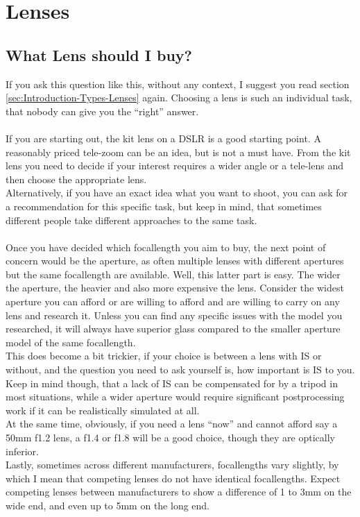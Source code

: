 \chapter{Lenses}
\label{chap:Lenses}





\section{What Lens should I buy?}

If you ask this question like this, without any context, I suggest you read section \ref{sec:Introduction-Types-Lenses} again. Choosing a lens is such an individual task, that nobody can give you the ``right'' answer.
\\
\\
If you are starting out, the kit lens on a \gls{DSLR} is a good starting point. A reasonably priced tele-zoom can be an idea, but is not a must have. From the kit lens you need to decide if your interest requires a wider angle or a tele-lens and then choose the appropriate lens.
\\
Alternatively, if you have an exact idea what you want to shoot, you can ask for a recommendation for this specific task, but keep in mind, that sometimes different people take different approaches to the same task.
\\
\\
Once you have decided which \gls{focallength} you aim to buy, the next point of concern would be the \gls{aperture}, as often multiple lenses with different \glspl{aperture} but the same \gls{focallength} are available. Well, this latter part is easy. The wider the \gls{aperture}, the heavier and also more expensive the lens. Consider the widest \gls{aperture} you can afford or are willing to afford and are willing to carry on any lens and research it. Unless you can find any specific issues with the model you researched, it will always have superior glass compared to the smaller \gls{aperture} model of the same \gls{focallength}.
\\
This does become a bit trickier, if your choice is between a lens with \gls{IS} or without, and the question you need to ask yourself is, how important is \gls{IS} to you. Keep in mind though, that a lack of \gls{IS} can be compensated for by a tripod in most situations, while a wider \gls{aperture} would require significant postprocessing work if it can be realistically simulated at all.
\\
At the same time, obviously, if you need a lens ``now'' and cannot afford say a 50mm f1.2 lens, a f1.4 or f1.8 will be a good choice, though they are optically inferior.
\\
Lastly, sometimes across different manufacturers, \glspl{focallength} vary slightly, by which I mean that competing lenses do not have identical \glspl{focallength}. Expect competing lenses between manufacturers to show a difference of 1 to 3mm on the wide end, and even up to 5mm on the long end.
